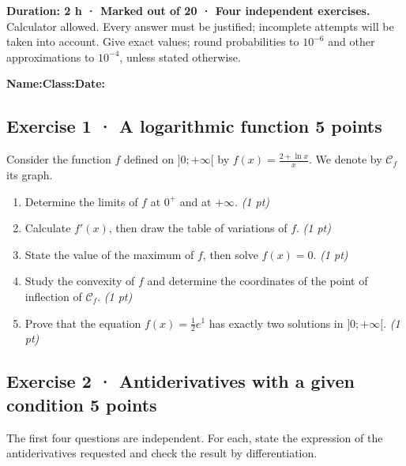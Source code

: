 \textbf{Duration: 2 h · Marked out of 20 · Four independent exercises.}\\Calculator allowed. Every answer must be justified; incomplete attempts will be taken into account. Give exact values; round probabilities to $10^{-6}$ and other approximations to $10^{-4}$, unless stated otherwise.

\smallskip\textbf{Name:}\enspace\dotfill\quad\textbf{Class:}\enspace\dotfill\quad\textbf{Date:}\enspace\dotfill

\subsection*{Exercise 1 · A logarithmic function \hfill 5 points}Consider the function $f$ defined on $]0;+\infty[$ by $f(x)=\frac{2+\ln x}x$. We denote by $\mathcal C_f$ its graph.

\begin{enumerate}

\item Determine the limits of $f$ at $0^+$ and at $+\infty$. \hfill\textit{(1 pt)}

\item Calculate $f' (x)$, then draw the table of variations of $f$. \hfill\textit{(1 pt)}

\item State the value of the maximum of $f$, then solve $f(x)=0$. \hfill\textit{(1 pt)}

\item Study the convexity of $f$ and determine the coordinates of the point of inflection of $\mathcal C_f$. \hfill\textit{(1 pt)}

\item Prove that the equation $f(x)=\frac12 e^{1}$ has exactly two solutions in $]0;+\infty[$. \hfill\textit{(1 pt)}

\end{enumerate}

\subsection*{Exercise 2 · Antiderivatives with a given condition \hfill 5 points}The first four questions are independent. For each, state the expression of the antiderivatives requested and check the result by differentiation.

